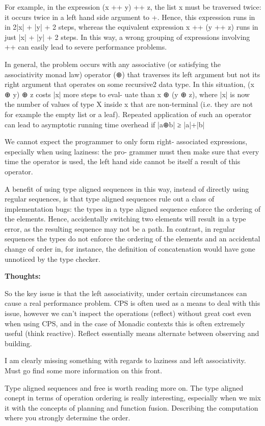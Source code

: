 \documentclass{article}
\begin{document}
For example, in the expression (x ++ y) ++ z, the list x must be traversed twice: it occurs twice in a left hand side argument to +. Hence, this expression runs in in 2|x| + |y| + 2 steps, whereas the equivalent expression x ++ (y ++ z) runs in just |x| + |y| + 2 steps. In this way, a wrong grouping of expressions involving ++ can easily lead to severe performance problems. 

In general, the problem occurs with any associative (or satisfying the associativity monad law) operator (⊕) that traverses its left argument but not its right argument that operates on some recursive2 data type. In this situation, (x ⊕ y) ⊕ z costs |x| more steps to eval- uate than x ⊕ (y ⊕ z), where |x| is now the number of values of type X inside x that are non-terminal (i.e. they are not for example the empty list or a leaf). Repeated application of such an operator can lead to asymptotic running time overhead if |a⊕b| ≥ |a|+|b|

We cannot expect the programmer to only form right- associated expressions, especially when using laziness: the pro- grammer must then make sure that every time the operator is used, the left hand side cannot be itself a result of this operator.

A benefit of using type aligned sequences in this way, instead of directly using regular sequences, is that type aligned sequences rule out a class of implementation bugs: the types in a type aligned sequence enforce the ordering of the elements. Hence, accidentally switching two elements will result in a type error, as the resulting sequence may not be a path. In contrast, in regular sequences the types do not enforce the ordering of the elements and an accidental change of order in, for instance, the definition of concatenation would have gone unnoticed by the type checker.

\textbf{Thoughts:}

So the key issue is that the left associativity, under certain circumstances can cause a real performance problem. CPS is often used as a means to deal with this issue, however we can't inspect the operations (reflect) without great cost even when using CPS, and in the case of Monadic contexts this is often extremely useful (think reactive). Reflect essentially means alternate between observing and building.

I am clearly missing something with regards to laziness and left associativity. Must go find some more information on this front. 

Type aligned sequences and free is worth reading more on. The type aligned conept in terms of operation ordering is really interesting, especially when we mix it with the concepts of planning and function fusion. Describing the computation where you strongly determine the order.
\end{document}
